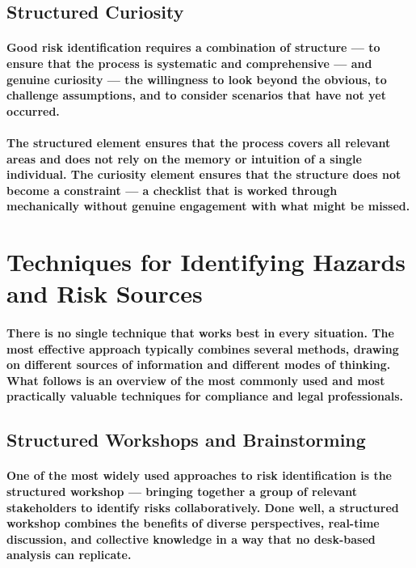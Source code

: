 \subsection{Structured Curiosity}
\paragraph{Good risk identification requires a combination of structure — to ensure that the process is systematic and comprehensive — and genuine curiosity — the willingness to look beyond the obvious, to challenge assumptions, and to consider scenarios that have not yet occurred.}
\paragraph{The structured element ensures that the process covers all relevant areas and does not rely on the memory or intuition of a single individual. The curiosity element ensures that the structure does not become a constraint — a checklist that is worked through mechanically without genuine engagement with what might be missed.}

\section{Techniques for Identifying Hazards and Risk Sources}
\paragraph{There is no single technique that works best in every situation. The most effective approach typically combines several methods, drawing on different sources of information and different modes of thinking. What follows is an overview of the most commonly used and most practically valuable techniques for compliance and legal professionals.}

\subsection{Structured Workshops and Brainstorming}
\paragraph{One of the most widely used approaches to risk identification is the \textbf{structured workshop} — bringing together a group of relevant stakeholders to identify risks collaboratively. Done well, a structured workshop combines the benefits of diverse perspectives, real-time discussion, and collective knowledge in a way that no desk-based analysis can replicate.}
